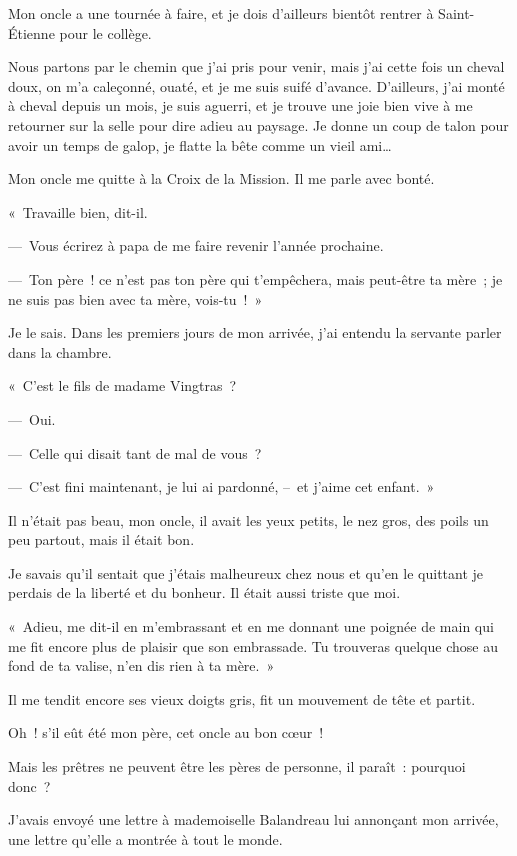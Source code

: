 \documentclass[french,twoside]{book} %
\begin{document}
Mon oncle a une tournée à faire, et je dois d’ailleurs bientôt rentrer à Saint-Étienne pour le collège.\par
Nous partons par le chemin que j’ai pris pour venir, mais j’ai cette fois un cheval doux, on m’a caleçonné, ouaté, et je me suis suifé d’avance. D’ailleurs, j’ai monté à cheval depuis un mois, je suis aguerri, et je trouve une joie bien vive à me retourner sur la selle pour dire adieu au paysage. Je donne un coup de talon pour avoir un temps de galop, je flatte la bête comme un vieil ami…\par
Mon oncle me quitte à la Croix de la Mission. Il me parle avec bonté.\par
« Travaille bien, dit-il.\par
— Vous écrirez à papa de me faire revenir l’année prochaine.\par
— Ton père ! ce n’est pas ton père qui t’empêchera, mais peut-être ta mère ; je ne suis pas bien avec ta mère, vois-tu ! »\par
Je le sais. Dans les premiers jours de mon arrivée, j’ai entendu la servante parler dans la chambre.\par
« C’est le fils de madame Vingtras ?\par
— Oui.\par
— Celle qui disait tant de mal de vous ?\par
— C’est fini maintenant, je lui ai pardonné, – et j’aime cet enfant. »\par
\bigbreak
\noindent Il n’était pas beau, mon oncle, il avait les yeux petits, le nez gros, des poils un peu partout, mais il était bon.\par
Je savais qu’il sentait que j’étais malheureux chez nous et qu’en le quittant je perdais de la liberté et du bonheur. Il était aussi triste que moi.\par
\bigbreak
\noindent « Adieu, me dit-il en m’embrassant et en me donnant une poignée de main qui me fit encore plus de plaisir que son embrassade. Tu trouveras quelque chose au fond de ta valise, n’en dis rien à ta mère. »\par
Il me tendit encore ses vieux doigts gris, fit un mouvement de tête et partit.\par
Oh ! s’il eût été mon père, cet oncle au bon cœur !\par
Mais les prêtres ne peuvent être les pères de personne, il paraît : pourquoi donc ?\par
J’avais envoyé une lettre à mademoiselle Balandreau lui annonçant mon arrivée, une lettre qu’elle a montrée à tout le monde.\par
\end{document}
